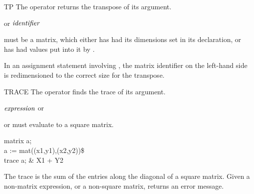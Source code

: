\begin{Operator}{TP}
The  operator returns the transpose of its 
 argument.
\begin{Syntax}
  or  \(\meta{identifier}\)
\end{Syntax}

 must be a matrix, which either has had its dimensions set
in its declaration, or has had values put into it by .

\begin{Comments}
In an assignment statement involving , the matrix identifier on the
left-hand side is redimensioned to the correct size for the transpose.
\end{Comments}
\end{Operator}


\begin{Operator}{TRACE}
The  operator finds the trace of its  argument.
\begin{Syntax}
\(\meta{expression}\) or  
\end{Syntax}

 or  must evaluate to a square
matrix.

\begin{Examples}
matrix a; \\
a := mat((x1,y1),(x2,y2))\$ \\
trace a;                     &         X1 + Y2
\end{Examples}
\begin{Comments}
The trace is the sum of the entries along the diagonal of a square matrix.
Given a non-matrix expression, or a non-square matrix,  returns
an error message.
\end{Comments}
\end{Operator}


